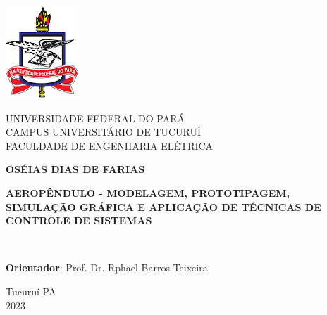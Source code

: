 	\newpage
	\thispagestyle{empty}
		\newpage
		\setcounter{page}{2}
		\newpage
		\thispagestyle{empty}
		\begin{center}
  
            \includegraphics[scale=0.5]{Figuras/logoufpa.png}
            
			UNIVERSIDADE FEDERAL DO PARÁ\\
			CAMPUS UNIVERSITÁRIO DE TUCURUÍ\\
			FACULDADE DE ENGENHARIA ELÉTRICA
			
			\vspace{7mm}
			
			\vfill
			
			\textbf{OSÉIAS DIAS DE FARIAS}
			
			\vfill
			
			\vspace{10mm}
			
			\textbf{AEROPÊNDULO - MODELAGEM, PROTOTIPAGEM, SIMULAÇÃO GRÁFICA E APLICAÇÃO DE TÉCNICAS DE CONTROLE DE SISTEMAS}
						
			\vfill\vfill
			
			\begin{flushright}				
				{\setlength{\fboxsep}{0pt}}
				
				\\
				\vspace{10pt}
				\begin{flushleft}
				\hspace{8.9cm}	{\footnotesize \textbf{Orientador}: Prof. Dr. Rphael Barros Teixeira} \\
				\end{flushleft}
			\end{flushright}
			\vfill\vfill
			Tucuruí-PA\\			
			2023
		\end{center}